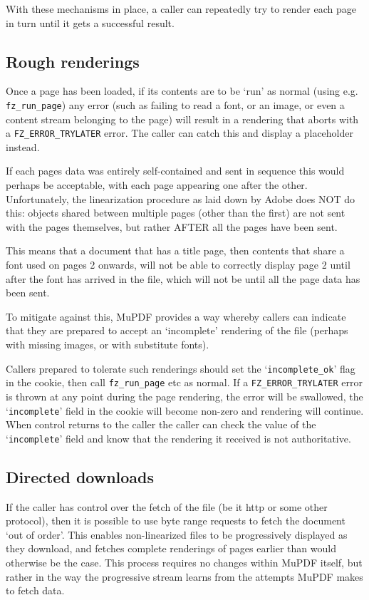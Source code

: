 \documentclass[oneside]{book}
\begin{document}
With these mechanisms in place, a caller can repeatedly try to render each page in turn until it gets a successful result.

\subsection{Rough renderings}

Once a page has been loaded, if its contents are to be `run' as normal (using e.g. \texttt{fz\_run\_page}) any error (such as failing to read a font, or an image, or even a content stream belonging to the page) will result in a rendering that aborts with a \texttt{FZ\_ERROR\_TRYLATER} error. The caller can catch this and display a placeholder instead.

If each pages data was entirely self-contained and sent in sequence this would perhaps be acceptable, with each page appearing one after the other. Unfortunately, the linearization procedure as laid down by Adobe does NOT do this: objects shared between multiple pages (other than the first) are not sent with the pages themselves, but rather AFTER all the pages have been sent.

This means that a document that has a title page, then contents that share a font used on pages 2 onwards, will not be able to correctly display page 2 until after the font has arrived in the file, which will not be until all the page data has been sent.

To mitigate against this, MuPDF provides a way whereby callers can indicate that they are prepared to accept an `incomplete' rendering of the file (perhaps with missing images, or with substitute fonts).

Callers prepared to tolerate such renderings should set the `\texttt{incomplete\_ok}' flag in the cookie, then call \texttt{fz\_run\_page} etc as normal. If a \texttt{FZ\_ERROR\_TRYLATER} error is thrown at any point during the page rendering, the error will be swallowed, the `\texttt{incomplete}' field in the cookie will become non-zero and rendering will continue. When control returns to the caller the caller can check the value of the `\texttt{incomplete}' field and know that the rendering it received is not authoritative.

\subsection{Directed downloads}

If the caller has control over the fetch of the file (be it http or some other protocol), then it is possible to use byte range requests to fetch the document `out of order'. This enables non-linearized files to be progressively displayed as they download, and fetches complete renderings of pages earlier than would otherwise be the case. This process requires no changes within MuPDF itself, but rather in the way the progressive stream learns from the attempts MuPDF makes to fetch data.
\end{document}
